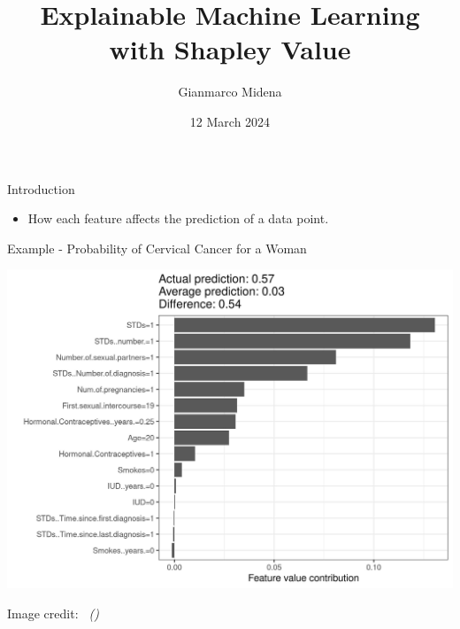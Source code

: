 \documentclass[dvipsnames]{beamer}
\title[XAI with Shapley Value]
{Explainable Machine Learning\\with Shapley Value}
\author{Gianmarco Midena}
\institute{Aalto University}
\date{12 March 2024}
\newcommand{\credit}[2]{\par\hfill \footnotesize #1 credit:~\itshape\citeauthor{#2} (\citeyear{#2})}
\begin{document}
\begin{frame}
\titlepage
\end{frame}


\begin{frame}{Introduction}
	\begin{itemize}
		\item How each feature affects the prediction of a data point.
	\end{itemize}
\end{frame}

\begin{frame}{Example - Probability of Cervical Cancer for a Woman}
	\begin{center}
		\includegraphics[scale=0.6]{images/shapley-cervical-plot-1.jpeg}
	\end{center}
\credit{Image}{molnar2020interpretable}
\end{frame}
\end{document}
